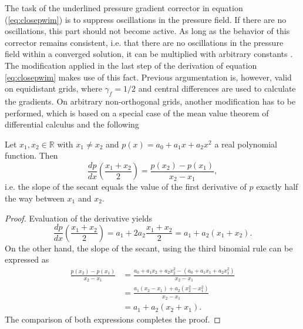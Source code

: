 The task of the underlined pressure gradient corrector in equation (\ref{eq:closepwim}) is to suppress oscillations in the pressure field. If there are no oscillations, this part should not become active. As long as the behavior of this corrector remains consistent, i.e. that there are no oscillations in the pressure field within a converged solution, it can be multiplied with arbitrary constants \cite{ferziger02}. The modification applied in the last step of the derivation of equation \ref{eq:closepwim} makes use of this fact. Previous argumentation is, however, valid on equidistant grids, where \(\gamma_f = 1/2\) and central differences are used to calculate the gradients. On arbitrary non-orthogonal grids, another modification has to be performed, which is based on a special case of the mean value theorem of differential calculus and the following 
\begin{prop}
  Let \(x_1,x_2 \in \mathbb{R}\) with \(x_1 \neq x_2\) and \(p(x) = a_0 + a_1 x + a_2 x^2\) a real polynomial function. Then 
  \begin{displaymath}
    \frac{dp}{dx}\left(\frac{x_1+x_2}{2}\right) = \frac{p(x_2) - p(x_1)}{x_2 - x_1},
  \end{displaymath}
  i.e. the slope of the secant equals the value of the first derivative of \(p\) exactly half the way between \(x_1\) and \(x_2\).
\end{prop}

\begin{proof}
Evaluation of the derivative yields
\begin{displaymath}
    \frac{dp}{dx}\left(\frac{x_1+x_2}{2}\right) = a_1 + 2 a_2 \frac{x_1 + x_2}{2} = a_1 + a_2(x_1 + x_2).
\end{displaymath}
On the other hand, the slope of the secant, using the third binomial rule can be expressed as
\begin{displaymath}
  \begin{array}{ll}
  \frac{p(x_2) - p(x_1)}{x_2 - x_1} 
&= \frac{a_0 + a_1 x_2 + a_2 x_2^2 - \left(a_0 + a_1 x_1 + a_2 x_1 ^2\right)}{x_2 - x_1} \\[1.0em]
  \quad &= \frac{a_1 (x_2 - x_1) + a_2 \left(x_2^2 - x_1^2\right)}{x_2 - x_1} \\[1.0em]
  \quad &= a_1 + a_2 (x_2 + x_1).
\end{array}
\end{displaymath}
The comparison of both expressions completes the proof.
\end{proof}

